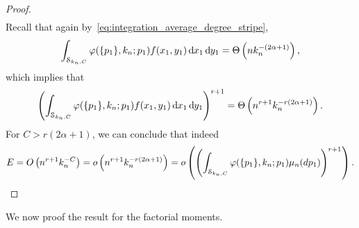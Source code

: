 \begin{proof}
\begin{align*}
\end{align*}
Recall that again by~\eqref{eq:integration_average_degree_stripe},
\begin{align*}
\int_{\mathcal{S}_{k_n,C}} \varphi(\{p_1\}, k_n ;p_1) f(x_1,y_1) \operatorname{\mathrm{d}\hspace{-2pt}} x_1 \operatorname{\mathrm{d}\hspace{-2pt}} y_1 = \Theta\left(n k_n^{-(2\alpha+1)}\right),
\end{align*}
which implies that
\begin{align*}
\left(\int_{\mathcal{S}_{k_n,C}} \varphi(\{p_1\}, k_n ;p_1)f(x_1,y_1) \operatorname{\mathrm{d}\hspace{-2pt}} x_1 \operatorname{\mathrm{d}\hspace{-2pt}} y_1\right)^{r+1} 
= \Theta\left(n^{r+1}k_n^{-r(2\alpha+1)}\right).
\end{align*}
For $C>r(2\alpha+1)$, we can conclude that indeed
\begin{align*}
E = O\left(n^{r+1}k_n^{-C}\right)=o\left(n^{r+1}k_n^{-r(2\alpha+1)}\right)=o\left(\left(\int_{\mathcal{S}_{k_n,C}} \varphi(\{p_1\}, k_n ;p_1)\mu_n(dp_1)\right)^{r+1}\right).
\end{align*}
\end{proof}

We now proof the result for the factorial moments.

